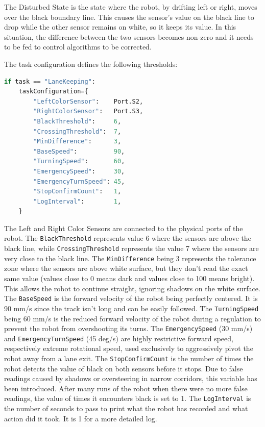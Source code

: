 The Disturbed State is the state where the robot, by drifting left or right, moves over the black boundary line. This causes the sensor's value on the black line to drop while the other sensor remains on white, so it keeps its value. In this situation, the difference between the two sensors becomes non-zero and it needs to be fed to control algorithms to be corrected.

The task configuration defines the following thresholds:

\begin{lstlisting}[language=Python, caption={Lane keeping task configuration.}, label={lst:lk-config}]
if task == "LaneKeeping":
    taskConfiguration={
        "LeftColorSensor":    Port.S2,
        "RightColorSensor":   Port.S3,
        "BlackThreshold":     6,
        "CrossingThreshold":  7,
        "MinDifference":      3,
        "BaseSpeed":          90,
        "TurningSpeed":       60,
        "EmergencySpeed":     30,
        "EmergencyTurnSpeed": 45,
        "StopConfirmCount":   1,
        "LogInterval":        1,
    }
\end{lstlisting}

The Left and Right Color Sensors are connected to the physical ports of the robot. The \texttt{BlackThreshold} represents value 6 where the sensors are above the black line, while \texttt{CrossingThreshold} represents the value 7 where the sensors are very close to the black line. The \texttt{MinDifference} being 3 represents the tolerance zone where the sensors are above white surface, but they don't read the exact same value (values close to 0 means dark and values close to 100 means bright). This allows the robot to continue straight, ignoring shadows on the white surface. The \texttt{BaseSpeed} is the forward velocity of the robot being perfectly centered. It is 90 mm/s since the track isn't long and can be easily followed. The \texttt{TurningSpeed} being 60 mm/s is the reduced forward velocity of the robot during a regulation to prevent the robot from overshooting its turns. The \texttt{EmergencySpeed} (30 mm/s) and \texttt{EmergencyTurnSpeed} (45 deg/s) are highly restrictive forward speed, respectively extreme rotational speed, used exclusively to aggressively pivot the robot away from a lane exit. The \texttt{StopConfirmCount} is the number of times the robot detects the value of black on both sensors before it stops. Due to false readings caused by shadows or oversteering in narrow corridors, this variable has been introduced. After many runs of the robot when there were no more false readings, the value of times it encounters black is set to 1. The \texttt{LogInterval} is the number of seconds to pass to print what the robot has recorded and what action did it took. It is 1 for a more detailed log.

